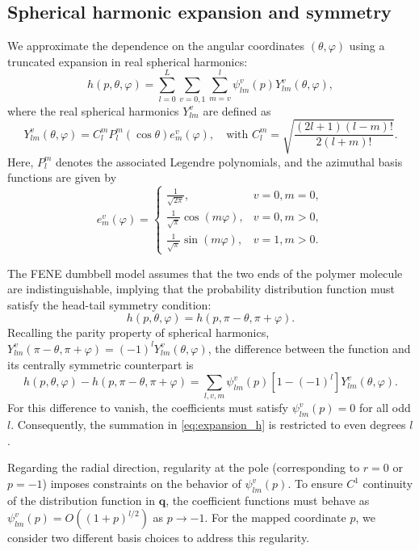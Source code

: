 \documentclass[preprint,12pt]{elsarticle}
\begin{document}
\subsection{Spherical harmonic expansion and symmetry}
We approximate the dependence on the angular coordinates $(\theta, \varphi)$ using a truncated expansion in real spherical harmonics:
\begin{equation}          
    h(p,\theta,\varphi)=\sum_{l=0}^{L}\sum_{v=0,1}\sum_{m=v}^l\psi_{lm}^v(p)Y_{lm}^v(\theta,\varphi), \label{eq:expansion_h}
\end{equation}
where the real spherical harmonics $Y_{lm}^v$ are defined as
\begin{equation}
    Y_{lm}^v(\theta,\varphi)=C_l^m P_l^m(\cos\theta)e_m^v(\varphi),\quad \text{with } C_l^m=\sqrt{\frac{(2l+1)(l-m)!}{2(l+m)!}}.
\end{equation}
Here, $P_l^m$ denotes the associated Legendre polynomials, and the azimuthal basis functions are given by
\begin{equation}
    e_m^v(\varphi)=\begin{cases}
        \frac{1}{\sqrt{2\pi}}, & v=0, m=0, \\
        \frac{1}{\sqrt{\pi}}\cos(m\varphi), & v=0, m>0, \\
        \frac{1}{\sqrt{\pi}}\sin(m\varphi), & v=1, m>0.
    \end{cases}
\end{equation}

The FENE dumbbell model assumes that the two ends of the polymer molecule are indistinguishable, implying that the probability distribution function must satisfy the head-tail symmetry condition:
\begin{equation}
    h(p,\theta,\varphi) = h(p,\pi-\theta,\pi+\varphi).\label{eq:symmetry}
\end{equation}
Recalling the parity property of spherical harmonics, $Y_{lm}^v(\pi-\theta,\pi+\varphi)=(-1)^lY_{lm}^v(\theta,\varphi)$, the difference between the function and its centrally symmetric counterpart is
\begin{equation*}
    h(p,\theta,\varphi)-h(p,\pi-\theta,\pi+\varphi) = \sum_{l,v,m}\psi_{lm}^v(p)\left[1-(-1)^l\right]Y_{lm}^v(\theta,\varphi).
\end{equation*}
For this difference to vanish, the coefficients must satisfy $\psi_{lm}^v(p) = 0$ for all odd $l$. Consequently, the summation in \eqref{eq:expansion_h} is restricted to even degrees $l$.

Regarding the radial direction, regularity at the pole (corresponding to $r=0$ or $p=-1$) imposes constraints on the behavior of $\psi_{lm}^v(p)$. To ensure $C^1$ continuity of the distribution function in $\bm{q}$, the coefficient functions must behave as $\psi_{lm}^v(p)=O((1+p)^{l/2})$ as $p\to -1$. For the mapped coordinate $p$, we consider two different basis choices to address this regularity.
\end{document}
